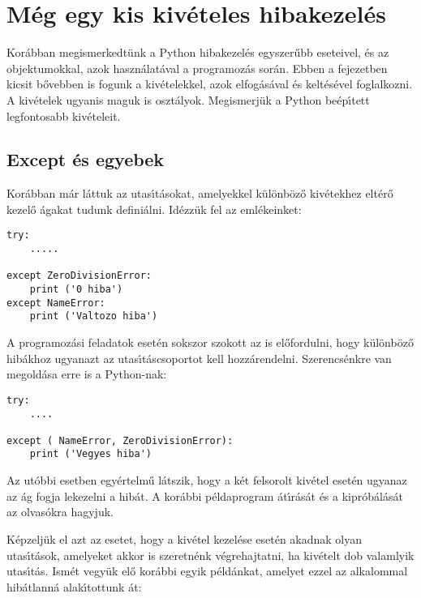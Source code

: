\section{M\'eg egy kis kiv\'eteles hibakezel\'es}

Kor\'abban megismerkedt\"unk a Python hibakezel\'es egyszer\H{u}bb eseteivel, \'es az objektumokkal, azok haszn\'alat\'aval 
a programoz\'as sor\'an. Ebben a fejezetben kicsit b\H{o}vebben is fogunk a kiv\'etelekkel, azok elfog\'as\'aval \'es 
kelt\'es\'evel foglalkozni. A kiv\'etelek ugyanis maguk is oszt\'alyok. Megismerj\"uk a Python be\'ep\'{\i}tett legfontosabb 
kiv\'eteleit. 

\subsection{Except \'es egyebek}

Kor\'abban m\'ar l\'attuk az utas\'{\i}t\'asokat, amelyekkel k\"ul\"onb\"oz\H{o} kiv\'etekhez elt\'er\H{o} kezel\H{o} 
\'agakat tudunk defini\'alni. Id\'ezz\"uk fel az eml\'ekeinket:

\begin{Verbatim}[fontsize=\small]
try:
    .....

except ZeroDivisionError:
    print ('0 hiba')
except NameError:
    print ('Valtozo hiba')
\end{Verbatim}

A programoz\'asi feladatok eset\'en sokszor szokott az is el\H{o}fordulni, hogy k\"ul\"onb\"oz\H{o} hib\'akhoz ugyanazt 
az utas\'{\i}t\'ascsoportot kell hozz\'arendelni. Szerencs\'enkre van megold\'asa erre is a Python-nak:

\begin{Verbatim}[fontsize=\small]    
try:
    ....

except ( NameError, ZeroDivisionError):
    print ('Vegyes hiba')
\end{Verbatim}

Az ut\'obbi esetben egy\'ertelm\H{u} l\'atszik, hogy a k\'et felsorolt kiv\'etel eset\'en ugyanaz az \'ag fogja lekezelni 
a hib\'at. A kor\'abbi p\'eldaprogram \'at\'{\i}r\'as\'at \'es a kipr\'ob\'al\'as\'at az olvas\'okra hagyjuk. 

K\'epzelj\"uk el azt az esetet, hogy a kiv\'etel kezel\'ese eset\'en akadnak olyan utas\'{\i}t\'a\-sok, amelyeket akkor 
is szeretn\'enk v\'egrehajtatni, ha kiv\'etelt dob valamlyik utas\'{\i}t\'as. Ism\'et vegy\"uk el\H{o} kor\'abbi 
egyik p\'eld\'ankat, amelyet ezzel az alkalommal hib\'atlann\'a alak\'{\i}tottunk \'at:

